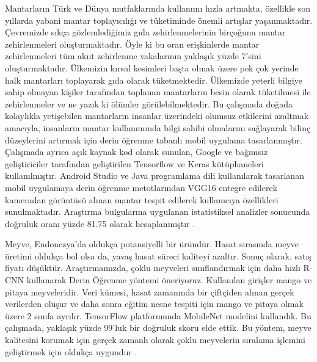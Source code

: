 \documentclass[12pt,a4paper]{article}
\begin{document}
		
		\hspace{3em} Mantarların Türk ve Dünya mutfaklarında kullanımı hızla artmakta, özellikle son
		yıllarda yabani mantar toplayıcılığı ve tüketiminde önemli artışlar yaşanmaktadır.
		Çevremizde sıkça gözlemlediğimiz gıda zehirlenmelerinin birçoğunu mantar zehirlenmeleri oluşturmaktadır. Öyle ki bu oran erişkinlerde mantar zehirlenmeleri tüm
		akut zehirlenme vakalarının yaklaşık yüzde 7'sini oluşturmaktadır. Ülkemizin kırsal kesimleri
		başta olmak üzere pek çok yerinde halk mantarları toplayarak gıda olarak tüketmektedir.
		Ülkemizde yeterli bilgiye sahip olmayan kişiler tarafından toplanan mantarların besin
		olarak tüketilmesi ile zehirlenmeler ve ne yazık ki ölümler görülebilmektedir. Bu
		çalışmada doğada kolaylıkla yetişebilen mantarların insanlar üzerindeki olumsuz
		etkilerini azaltmak amacıyla, insanların mantar kullanımında bilgi sahibi olmalarını
		sağlayarak bilinç düzeylerini artırmak için derin öğrenme tabanlı mobil uygulama
		tasarlanmıştır. Çalışmada ayrıca açık kaynak kod olarak sunulan, Google ve bağımsız
		geliştiriciler tarafından geliştirilen Tensorflow ve Keras kütüphaneleri kullanılmıştır.
		Android Studio ve Java programlama dili kullanılarak tasarlanan mobil uygulamaya derin
		öğrenme metotlarından VGG16 entegre edilerek kameradan görüntüsü alınan mantar
		tespit edilerek kullanıcıya özellikleri sunulmaktadır. Araştırma bulgularına uygulanan
		istatistiksel analizler sonucunda doğruluk oranı yüzde 81.75 olarak hesaplanmıştır
		\cite{akin2023dogada}.
		
		
		
		
		
		
		
		
		
		Meyve, Endonezya'da oldukça potansiyelli bir üründür. Hasat sırasında meyve üretimi oldukça bol olsa da, yavaş hasat süreci kaliteyi azaltır. Sonuç olarak, satış fiyatı düşüktür. Araştırmamızda, çoklu meyveleri sınıflandırmak için daha hızlı R-CNN kullanarak Derin Öğrenme yöntemi öneriyoruz. Kullanılan girişler mango ve pitaya meyveleridir. Veri kümesi, hasat zamanında bir çiftçiden alınan gerçek verilerden oluşur ve daha sonra eğitim nesne tespiti için mango ve pitaya olmak üzere 2 sınıfa ayrılır. TensorFlow platformunda MobileNet modelini kullandık. Bu çalışmada, yaklaşık yüzde 99'luk bir doğruluk skoru elde ettik. Bu yöntem, meyve kalitesini korumak için gerçek zamanlı olarak çoklu meyvelerin sıralama işlemini geliştirmek için oldukça uygundur \cite{8628566}.
		
		
		
\end{document}
